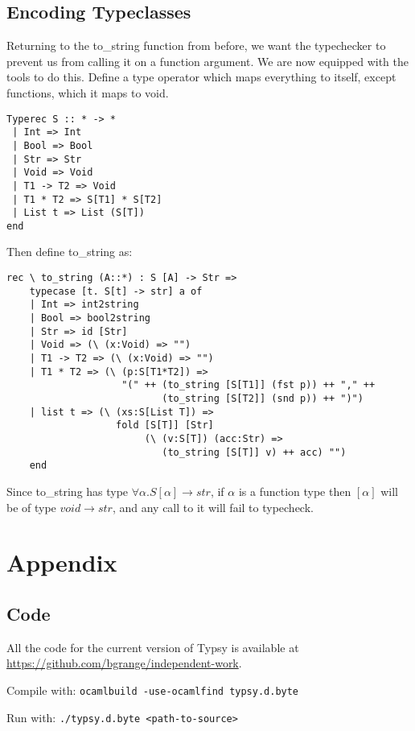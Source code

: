\documentclass[pageno]{jpaper}
\begin{document}
{{{\subsection{Encoding Typeclasses}
Returning to the to_string function from before, we want the typechecker to prevent us from calling
it on a function argument. We are now equipped with the tools to do this.
Define a type operator which maps everything to itself, except functions, which it maps to void.
\begin{lstlisting}
Typerec S :: * -> *
 | Int => Int
 | Bool => Bool
 | Str => Str
 | Void => Void
 | T1 -> T2 => Void
 | T1 * T2 => S[T1] * S[T2]
 | List t => List (S[T])
end
\end{lstlisting}

Then define to_string as:

\begin{lstlisting}[mathescape]
rec \ to_string (A::*) : S [A] -> Str =>
    typecase [t. S[t] -> str] a of
    | Int => int2string
    | Bool => bool2string
    | Str => id [Str]
    | Void => (\ (x:Void) => "")
    | T1 -> T2 => (\ (x:Void) => "")
    | T1 * T2 => (\ (p:S[T1*T2]) => 
                    "(" ++ (to_string [S[T1]] (fst p)) ++ "," ++
                           (to_string [S[T2]] (snd p)) ++ ")")
    | list t => (\ (xs:S[List T]) =>
                   fold [S[T]] [Str] 
                        (\ (v:S[T]) (acc:Str) =>
                           (to_string [S[T]] v) ++ acc) "")
    end
\end{lstlisting}

Since to_string has type $\forall \alpha. S[\alpha] \rightarrow str$, if $\alpha$ is a function type then
$[\alpha]$ will be of type $void \rightarrow str$, and any call to it will fail to typecheck.

\appendix
\section{Appendix}

\subsection{Code}

All the code for the current version of Typsy is available at \url{https://github.com/bgrange/independent-work}.

Compile with: \texttt{ocamlbuild -use-ocamlfind typsy.d.byte}

Run with: \texttt{./typsy.d.byte <path-to-source>}

}}}
\end{document}
